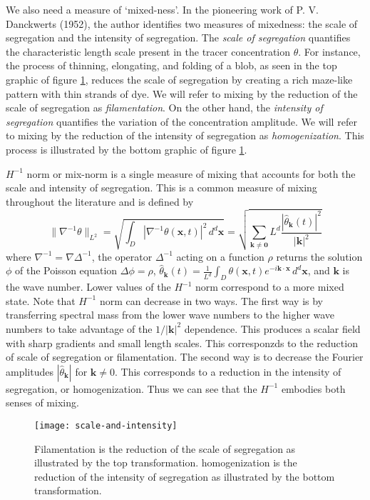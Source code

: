 \documentclass[12pt]{iopart}
\newcommand{\hmone}[1]{\|\nabla^{-1} #1\|_{L^{2}}}
\newcommand{\sint}[1]{\int_{D} #1 \, d^{d}\mathbf{x}}
\renewcommand{\vec}[1]{\mathbf{#1}}
\begin{document}
We also need a measure of `mixed-ness'. In the pioneering work of P. V. Danckwerts (1952)\cite{Danckwerts1952}, the author identifies two measures of mixedness: the scale of segregation and the intensity of segregation. The {\it scale of segregation } quantifies the characteristic length scale present in the tracer concentration $\theta$. For instance, the process of thinning, elongating, and folding of a blob, as seen in the top graphic of figure \ref{fig:scale-and-intensity}, reduces the scale of segregation by creating a rich maze-like pattern with thin strands of dye. We will refer to mixing by the reduction of the scale of segregation as {\it filamentation}.  On the other hand, the {\it intensity of segregation } quantifies the variation of the concentration amplitude. We will refer to mixing by the reduction of the intensity of segregation as {\it homogenization}. This process is illustrated by the bottom graphic of figure \ref{fig:scale-and-intensity}.

 $H^{-1}$ norm or mix-norm \cite{GM2005} is a single measure of mixing that accounts for both the scale and intensity of segregation. This is a common measure of mixing throughout the literature and is defined by  
%
\begin{equation}
\hmone{\theta}=\sqrt{\sint{ |\nabla^{-1} \theta( \vec{x},t)|^2}}=\sqrt{ \sum_{\vec{k}\neq \vec{0}} L^d \frac{|\hat{\theta}_{\vec{k}}(t)|^{2}}{|\vec{k}|^2}}
\end{equation}
%
where $\nabla^{-1}=\nabla \Delta^{-1}$, the operator $\Delta^{-1}$ acting on  a function $\rho$ returns the solution $\phi$ of the Poisson equation $ \Delta \phi = \rho $, $\hat{\theta}_{\vec{k}}(t) =  \frac{1}{L^{d}}\sint{\theta(\vec{x},t)e^{-i\vec{k}\cdot\vec{x}}}$, and $\vec{k}$ is the wave number.  Lower values of the  $H^{-1}$ norm correspond to a more mixed state. Note that $H^{-1}$ norm can decrease in two ways.  The first way is by transferring spectral mass from the lower wave numbers to the higher wave numbers to take advantage of the $1/|\vec{k}|^2$ dependence. This produces a scalar field with sharp gradients and small length scales. This corresponzds to the reduction of scale of segregation or filamentation. The second way is to decrease the Fourier amplitudes $|\hat{\theta}_{\vec{k}}|$ for $\vec{k}\neq 0$. This corresponds to a reduction in the intensity of segregation, or homogenization. Thus we can see that the $H^{-1}$ embodies both senses of mixing. 

\begin{figure}
	\centering
	\texttt{[image: scale-and-intensity]}
	\caption{Filamentation is the reduction of the scale of segregation as illustrated by the top transformation. homogenization is the reduction of the intensity of segregation as illustrated by the bottom transformation.}
	\label{fig:scale-and-intensity}
\end{figure}
\end{document}
